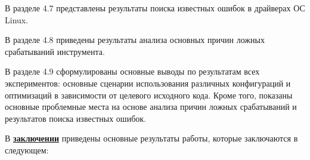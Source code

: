 В разделе 4.7 представлены результаты поиска известных ошибок в драйверах ОС Linux.

В разделе 4.8 приведены результаты анализа основных причин ложных срабатываний инструмента.

В разделе 4.9 сформулированы основные выводы по результатам всех экспериментов: основные сценарии использования различных конфигураций и оптимизаций в зависимости от целевого исходного кода.
Кроме того, показаны основные проблемные места на основе анализа причин ложных срабатываний и результатов поиска известных ошибок.

%

В \underline{\textbf{заключении}} приведены основные результаты работы, которые заключаются в следующем:




